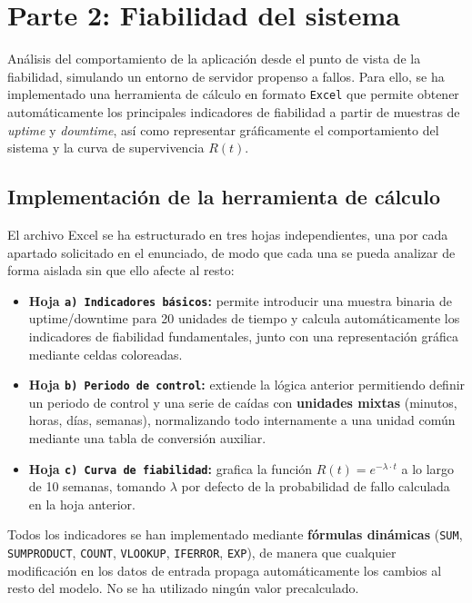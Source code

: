 \documentclass{article}
\begin{document}
\section{Parte 2: Fiabilidad del sistema}
Análisis del comportamiento de la aplicación desde el punto de vista de la fiabilidad,
simulando un entorno de servidor propenso a fallos. Para ello, se ha implementado una
herramienta de cálculo en formato \texttt{Excel} que permite obtener automáticamente
los principales indicadores de fiabilidad a partir de muestras de \textit{uptime} y
\textit{downtime}, así como representar gráficamente el comportamiento del sistema y
la curva de supervivencia $R(t)$.

\subsection{Implementación de la herramienta de cálculo}

El archivo Excel se ha estructurado en tres hojas independientes, una por cada apartado
solicitado en el enunciado, de modo que cada una se pueda analizar de forma aislada
sin que ello afecte al resto:

\begin{itemize}
    \item \textbf{Hoja \texttt{a) Indicadores básicos}:} permite introducir una muestra
          binaria de uptime/downtime para 20 unidades de tiempo y calcula automáticamente
          los indicadores de fiabilidad fundamentales, junto con una representación
          gráfica mediante celdas coloreadas.
    \item \textbf{Hoja \texttt{b) Periodo de control}:} extiende la lógica anterior
          permitiendo definir un periodo de control y una serie de caídas con \textbf{unidades
          mixtas} (minutos, horas, días, semanas), normalizando todo internamente a una
          unidad común mediante una tabla de conversión auxiliar.
    \item \textbf{Hoja \texttt{c) Curva de fiabilidad}:} grafica la función
          $R(t) = e^{-\lambda \cdot t}$ a lo largo de 10 semanas, tomando $\lambda$ por
          defecto de la probabilidad de fallo calculada en la hoja anterior.
\end{itemize}

Todos los indicadores se han implementado mediante \textbf{fórmulas dinámicas}
(\texttt{SUM}, \texttt{SUMPRODUCT}, \texttt{COUNT}, \texttt{VLOOKUP},
\texttt{IFERROR}, \texttt{EXP}), de manera que cualquier modificación en los datos de
entrada propaga automáticamente los cambios al resto del modelo. No se ha utilizado
ningún valor precalculado.
\end{document}
